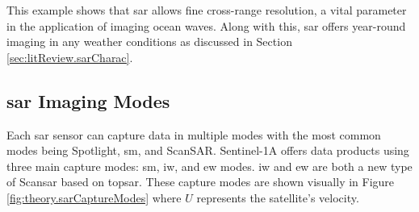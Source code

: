 This example shows that \acs{sar} allows fine cross-range resolution, a vital parameter in the application of imaging ocean waves. Along with this, \acs{sar} offers year-round imaging in any weather conditions as discussed in Section \ref{sec:litReview.sarCharac}.

\subsection{\acs{sar} Imaging Modes} \label{subsec:theory.sar.imaging}

Each \acs{sar} sensor can capture data in multiple modes with the most common modes being Spotlight, \ac{sm}, and ScanSAR. Sentinel-1A offers data products using three main capture modes: \acs{sm}, \ac{iw}, and \ac{ew} modes. \ac{iw} and \ac{ew} are both a new type of Scan\acs{sar} based on \ac{topsar}. These capture modes are shown visually in Figure \ref{fig:theory.sarCaptureModes} where $U$ represents the satellite's velocity.



